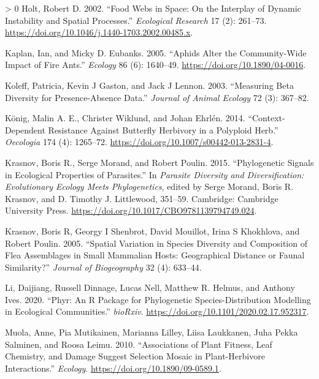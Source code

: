 \documentclass[11pt]{article}
\newlength{\cslhangindent}
\newenvironment{CSLReferences}[3] %
 {%
  \setlength{\parindent}{0pt}
  \ifodd #1 \everypar{\setlength{\hangindent}{\cslhangindent}}\ignorespaces\fi
  \ifnum #2 > 0
  \setlength{\parskip}{#2\baselineskip}
  \fi
 }%
 {}
\begin{document}
\begin{CSLReferences}{1}{0}
\leavevmode\hypertarget{ref-Holt2002FooWeb}{}%
Holt, Robert D. 2002. {``Food Webs in Space: On the Interplay of Dynamic
Instability and Spatial Processes.''} \emph{Ecological Research} 17 (2):
261--73. \url{https://doi.org/10.1046/j.1440-1703.2002.00485.x}.

\leavevmode\hypertarget{ref-Kaplan2005AphAlt}{}%
Kaplan, Ian, and Micky D. Eubanks. 2005. {``Aphids Alter the
Community-Wide Impact of Fire Ants.''} \emph{Ecology} 86 (6): 1640--49.
\url{https://doi.org/10.1890/04-0016}.

\leavevmode\hypertarget{ref-Koleff2003MeaBet}{}%
Koleff, Patricia, Kevin J Gaston, and Jack J Lennon. 2003. {``Measuring
Beta Diversity for Presence-Absence Data.''} \emph{Journal of Animal
Ecology} 72 (3): 367--82.

\leavevmode\hypertarget{ref-Konig2014ConRes}{}%
König, Malin A. E., Christer Wiklund, and Johan Ehrlén. 2014.
{``Context-Dependent Resistance Against Butterfly Herbivory in a
Polyploid Herb.''} \emph{Oecologia} 174 (4): 1265--72.
\url{https://doi.org/10.1007/s00442-013-2831-4}.

\leavevmode\hypertarget{ref-Krasnov2015PhySig}{}%
Krasnov, Boris R., Serge Morand, and Robert Poulin. 2015.
{``Phylogenetic Signals in Ecological Properties of Parasites.''} In
\emph{Parasite Diversity and Diversification: Evolutionary Ecology Meets
Phylogenetics}, edited by Serge Morand, Boris R. Krasnov, and D. Timothy
J. Littlewood, 351--59. Cambridge: Cambridge University Press.
\url{https://doi.org/10.1017/CBO9781139794749.024}.

\leavevmode\hypertarget{ref-Krasnov2005SpaVar}{}%
Krasnov, Boris R, Georgy I Shenbrot, David Mouillot, Irina S Khokhlova,
and Robert Poulin. 2005. {``Spatial Variation in Species Diversity and
Composition of Flea Assemblages in Small Mammalian Hosts: Geographical
Distance or Faunal Similarity?''} \emph{Journal of Biogeography} 32 (4):
633--44.

\leavevmode\hypertarget{ref-Li2020PhyRP}{}%
Li, Daijiang, Russell Dinnage, Lucas Nell, Matthew R. Helmus, and
Anthony Ives. 2020. {``Phyr: An R Package for Phylogenetic
Species-Distribution Modelling in Ecological Communities.''}
\emph{bioRxiv}. \url{https://doi.org/10.1101/2020.02.17.952317}.

\leavevmode\hypertarget{ref-Muola2010AssPla}{}%
Muola, Anne, Pia Mutikainen, Marianna Lilley, Liisa Laukkanen, Juha
Pekka Salminen, and Roosa Leimu. 2010. {``Associations of Plant Fitness,
Leaf Chemistry, and Damage Suggest Selection Mosaic in Plant-Herbivore
Interactions.''} \emph{Ecology}.
\url{https://doi.org/10.1890/09-0589.1}.


\end{CSLReferences}
\end{document}
